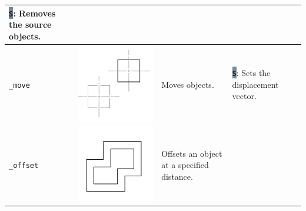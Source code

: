 \documentclass[..]{../IEEEphot}
\newcommand{\param}[1]{\colorbox{LightSlateGray}{\color{Navy}\texttt{\textbf{#1}}}}
\begin{document}
\begin{center}
\begin{longtable}{m{.2\linewidth}m{.2\linewidth}m{.25\linewidth}m{.25\linewidth}}
\param{S}: Removes the source objects.
\\		
\midrule
\texttt{\_move} & \includegraphics[width = 0.8\linewidth, keepaspectratio]{../images/jpg/_move.jpg} & Moves objects. & 
\param{S}: Sets the displacement vector.
\\			
\midrule
\texttt{\_offset} & \includegraphics[width = 0.8\linewidth, keepaspectratio]{../images/jpg/_offset.jpg} & Offsets an object at a specified distance.  & 
\\			
\midrule

\end{longtable}
\end{center}
\end{document}
